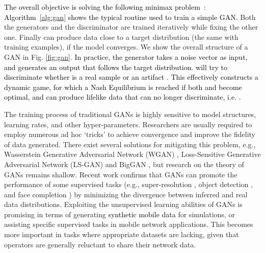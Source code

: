 \documentclass[journal,comsoc,letter]{IEEEtran}
\newcommand{\edit}[1]{\textcolor{black}{#1}}
\newcommand{\rev}[1]{\textcolor{black}{#1}}
\begin{document}
\edit{The overall objective is solving the following minimax problem~\cite{goodfellow2014generative}:
}\rev{Algorithm~\ref{alg:gan} shows the typical routine used to train a simple GAN.} Both the generators and the discriminator are trained iteratively while fixing the other one. Finally  can produce data close to a target distribution (the same with training examples), if the model converges. We show the overall structure of a GAN in Fig. \ref{fig:gan}. \rev{In practice, the generator  takes a noise vector  as input, and generates an output  that follows the target distribution.  will try to discriminate whether  is a real sample or an artifact \cite{goodfellow2016nips}. This effectively constructs a dynamic game, for which a Nash Equilibrium is reached if both  and  become optimal, and  can produce lifelike data that  can no longer discriminate, i.e. .}

The training process of traditional GANs is highly sensitive to model structures, learning rates, and other hyper-parameters. Researchers are usually required to employ numerous ad hoc `tricks' to achieve convergence and improve the fidelity of data generated. There exist several solutions for mitigating this problem, e.g., Wasserstein Generative Adversarial Network (WGAN) \cite{arjovsky2017wasserstein}, Loss-Sensitive Generative Adversarial Network (LS-GAN) \cite{qi2017loss} and BigGAN \cite{brock2018large}, but research on the theory of GANs remains shallow.  Recent work confirms that GANs can promote the performance of some supervised tasks (e.g., super-resolution \cite{ledig2017photo}, object detection \cite{li2017perceptual}, and face completion \cite{li2017generative}) by minimizing the divergence between inferred and real data distributions. Exploiting the unsupervised learning abilities of GANs is promising in terms of generating \edit{synthetic mobile data} for simulations, or assisting specific supervised tasks in mobile network applications. This becomes more important in tasks where appropriate datasets are lacking, given that operators are generally reluctant to share their network data.
\end{document}
